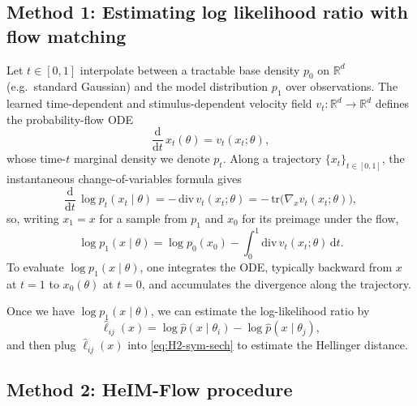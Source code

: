 \subsection{Method 1: Estimating log likelihood ratio with flow matching}
\label{sec:flow-matching}

Let $t\in[0,1]$ interpolate between a tractable base density $p_0$ on $\mathbb{R}^d$ (e.g.\ standard Gaussian) and the model distribution $p_1$ over observations.
The learned time-dependent and stimulus-dependent velocity field $v_t:\mathbb{R}^d\to\mathbb{R}^d$ defines the probability-flow ODE
\begin{equation}
  \frac{\mathrm{d}}{\mathrm{d}t}\, x_t(\theta) = v_t(x_t; \theta),
\end{equation}
whose time-$t$ marginal density we denote $p_t$.
Along a trajectory $\{x_t\}_{t\in[0,1]}$, the instantaneous change-of-variables formula gives
\begin{equation}
  \frac{\mathrm{d}}{\mathrm{d}t}\, \log p_t(x_t \mid \theta)
  = -\,\mathrm{div}\, v_t(x_t; \theta)
  = -\,\mathrm{tr}\!\bigl(\nabla_x v_t(x_t; \theta)\bigr),
\end{equation}
so, writing $x_1=x$ for a sample from $p_1$ and $x_0$ for its preimage under the flow,
\begin{equation}
  \log p_1(x \mid \theta)
  = \log p_0(x_0)
    - \int_0^1 \mathrm{div}\, v_t(x_t; \theta)\,\mathrm{d}t.
\end{equation}
To evaluate $\log p_1(x \mid \theta)$, one integrates the ODE, typically backward from $x$ at $t=1$ to $x_0(\theta)$ at $t=0$, and accumulates the divergence along the trajectory.

Once we have $\log p_1(x \mid \theta)$, we can estimate the log-likelihood ratio by
\begin{equation}
    \widehat{\ell}_{ij}(x)
    =
    \log \widehat p(x \mid \theta_i)
    -
    \log \widehat p(x \mid \theta_j),
\end{equation}
and then plug $\widehat{\ell}_{ij}(x)$ into \eqref{eq:H2-sym-sech} to estimate the Hellinger distance.

\subsection{Method 2: HeIM-Flow procedure}

